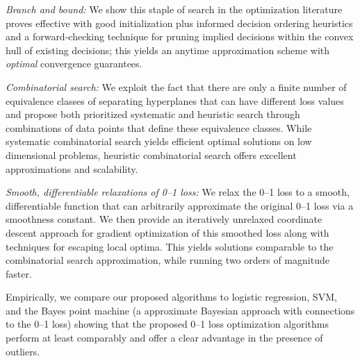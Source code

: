 \noindent\emph{Branch and bound:} We show this staple of search in the
optimization literature proves effective with good initialization 
plus informed decision ordering heuristics and a
forward-checking technique for pruning implied decisions within the
convex hull of existing decisions; this yields an anytime approximation
scheme with \emph{optimal} convergence guarantees.

\noindent\emph{Combinatorial search:} We exploit the fact that there
are only a finite number of equivalence classes of separating
hyperplanes that can have different loss values and propose both
prioritized systematic and heuristic search through combinations of
data points that define these equivalence classes.  While systematic
combinatorial search yields efficient optimal solutions on low
dimensional problems, heuristic combinatorial search offers excellent
approximations and scalability.

\noindent\emph{Smooth, differentiable relaxations of 0--1 loss:} We
relax the 0--1 loss to a smooth, differentiable function that can
arbitrarily approximate the original 0--1 loss via a smoothness
constant.  We then provide an iteratively unrelaxed coordinate descent
approach for gradient optimization of this smoothed loss along with
techniques for escaping local optima.  This yields solutions
comparable to the combinatorial search approximation, while running
two orders of magnitude faster.

Empirically, we compare our proposed algorithms to logistic
regression, SVM, and the Bayes point machine (a approximate Bayesian
approach with connections to the 0--1 loss) showing that the proposed
0--1 loss optimization algorithms perform at least comparably and
offer a clear advantage in the presence of outliers.  

